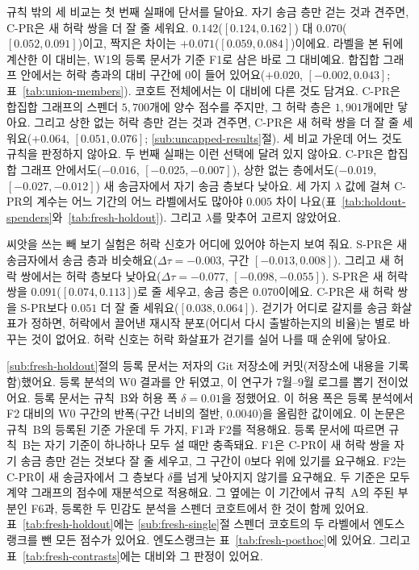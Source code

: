 규칙 밖의 세 비교는 첫 번째 실패에 단서를 달아요. 자기 송금 층만 걷는 것과 견주면, \mbox{C-PR}은 새 허락 쌍을 더 잘 줄 세워요. $0.142$($[0.124,0.162]$) 대 $0.070$($[0.052,0.091]$)이고, 짝지은 차이는 $+0.071$($[0.059,0.084]$)이에요. 라벨을 본 뒤에 계산한 이 대비는, W1의 등록 문서가 기준 F1로 삼은 바로 그 대비예요. 합집합 그래프 안에서는 허락 층과의 대비 구간에 0이 들어 있어요($+0.020$, $[-0.002,0.043]$; 표~\ref{tab:union-members}). 코호트 전체에서는 이 대비에 다른 것도 담겨요. \mbox{C-PR}은 합집합 그래프의 스펜더 $5{,}700$개에 양수 점수를 주지만, 그 허락 층은 $1{,}901$개에만 닿아요. 그리고 상한 없는 허락 층만 걷는 것과 견주면, \mbox{C-PR}은 새 허락 쌍을 더 잘 줄 세워요($+0.064$, $[0.051,0.076]$; \ref{sub:uncapped-results}절). 세 비교 가운데 어느 것도 규칙을 판정하지 않아요. 두 번째 실패는 이런 선택에 달려 있지 않아요. \mbox{C-PR}은 합집합 그래프 안에서도($-0.016$, $[-0.025,-0.007]$), 상한 없는 층에서도($-0.019$, $[-0.027,-0.012]$) 새 송금자에서 자기 송금 층보다 낮아요. 세 가지 $\lambda$ 값에 걸쳐 \mbox{C-PR}의 계수는 어느 기간의 어느 라벨에서도 많아야 $0.005$ 차이 나요(표~\ref{tab:holdout-spenders}와~\ref{tab:fresh-holdout}). 그리고 $\lambda$를 맞추어 고르지 않았어요.

씨앗을 쓰는 빼 보기 실험은 허락 신호가 어디에 있어야 하는지 보여 줘요. \mbox{S-PR}은 새 송금자에서 송금 층과 비슷해요($\Delta\tau=-0.003$, 구간 $[-0.013,0.008]$). 그리고 새 허락 쌍에서는 허락 층보다 낮아요($\Delta\tau=-0.077$, $[-0.098,-0.055]$). \mbox{S-PR}은 새 허락 쌍을 $0.091$($[0.074,0.113]$)로 줄 세우고, 송금 층은 $0.070$이에요. \mbox{C-PR}은 새 허락 쌍을 \mbox{S-PR}보다 $0.051$ 더 잘 줄 세워요($[0.038,0.064]$). 걷기가 어디로 갈지를 송금 화살표가 정하면, 허락에서 끌어낸 재시작 분포(어디서 다시 출발하는지의 비율)는 별로 바꾸는 것이 없어요. 허락 신호는 허락 화살표가 걷기를 실어 나를 때 순위에 닿아요.


\ref{sub:fresh-holdout}절의 등록 문서는 저자의 Git 저장소에 커밋(저장소에 내용을 기록함)했어요. 등록 분석의 W0 결과를 안 뒤였고, 이 연구가 7월--9월 로그를 뽑기 전이었어요. 등록 문서는 규칙~B와 허용 폭 $\delta=0.01$을 정했어요. 이 허용 폭은 등록 분석에서 F2 대비의 W0 구간의 반폭(구간 너비의 절반, $0.0040$)을 올림한 값이에요. 이 논문은 규칙~B의 등록된 기준 가운데 두 가지, F1과 F2를 적용해요. 등록 문서에 따르면 규칙~B는 자기 기준이 하나하나 모두 설 때만 충족돼요. F1은 \mbox{C-PR}이 새 허락 쌍을 자기 송금 층만 걷는 것보다 잘 줄 세우고, 그 구간이 0보다 위에 있기를 요구해요. F2는 \mbox{C-PR}이 새 송금자에서 그 층보다 $\delta$를 넘게 낮아지지 않기를 요구해요. 두 기준은 모두 계약 그래프의 점수에 재분석으로 적용해요. 그 옆에는 이 기간에서 규칙~A의 주된 부분인 F6과, 등록한 두 민감도 분석을 스펜더 코호트에서 한 것이 함께 있어요. 표~\ref{tab:fresh-holdout}에는 \ref{sub:fresh-single}절 스펜더 코호트의 두 라벨에서 엔도스랭크를 뺀 모든 점수가 있어요. 엔도스랭크는 표~\ref{tab:fresh-posthoc}에 있어요. 그리고 표~\ref{tab:fresh-contrasts}에는 대비와 그 판정이 있어요.

